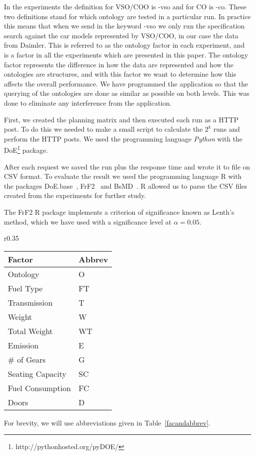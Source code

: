 \documentclass{llncs}
\begin{document}
In the experiments the definition for VSO/COO is \textsf{-vso} and for
CO is \textsf{-co}.  These two definitions stand for which ontology
are tested in a particular run. In practice this means that when we
send in the keyword \textsf{-vso} we only run the specification search
against the car models represented by VSO/COO, in our case the data
from Daimler. This is referred to as the ontology factor in each
experiment, and is a factor in all the experiments which are presented
in this paper. The ontology factor represents the difference in how
the data are represented and how the ontologies are structures, and
with this factor we want to determine how this affects the overall
performance.  We have programmed the application so that the querying
of the ontologies are done as similar as possible on both levels. This
was done to eliminate any interference from the application.

First, we created the planning matrix and then executed each run as a
HTTP post. To do this we needed to make a small script to calculate
the $2^k$ runs and perform the HTTP posts. We used the programming
language \emph{Python} with the
DoE\footnote{http://pythonhosted.org/pyDOE/} package.

After each request we saved the run plus
the response time and wrote it to file on CSV format. To evaluate the
result we used the programming language R with the packages
\textsf{DoE.base}~\cite{DoEBase}, \textsf{FrF2}~\cite{FrF2} and
\textsf{BsMD}~\cite{BsMD}. R allowed us to parse the CSV files created
from the experiments for further study.
 
The \textsf{FrF2} R package implements a criterion of significance
known as Lenth's method, which we have used with a significance level at $\alpha =
0.05$. %
%
\begin{wraptable}{r}{0.35\textwidth}
\vspace{-35pt}
    \begin{tabular}{ | l | l |}
    \hline
    {\bf Factor} & {\bf Abbrev} \\ \hline
   Ontology & \textsf{O} \\
   Fuel Type & \textsf{FT} \\
   Transmission & \textsf{T} \\
   Weight & \textsf{W} \\
   Total Weight & \textsf{WT} \\
   Emission & \textsf{E} \\
   \# of Gears & \textsf{G} \\
   Seating Capacity & \textsf{SC} \\
   Fuel Consumption & \textsf{FC} \\
   Doors & \textsf{D} \\
\hline
    \end{tabular}
\caption{Factors and their abbreviation}\label{facandabbrev}
\vspace{-45pt}
\end{wraptable}
%
For brevity, we will use abbreviations given in Table~\ref{facandabbrev}.
\end{document}
